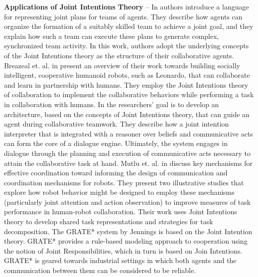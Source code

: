 \documentclass[12pt]{report}
\begin{document}
\textbf{Applications of Joint Intentions Theory} -- In \cite{kinny:planned-team}
authors introduce a language for representing joint plans for teams of agents.
They describe how agents can organize the formation of a suitably skilled team
to achieve a joint goal, and they explain how such a team can execute these
plans to generate complex, synchronized team activity. In this work, authors
adopt the underlying concepts of the Joint Intentions theory as the structure of
their collaborative agents. Breazeal et. al. in \cite{breazeal:humanoid-robots}
present an overview of their work towards building socially intelligent,
cooperative humanoid robots, such as Leonardo, that can collaborate and learn in
partnership with humans. They employ the Joint Intentions theory of
collaboration to implement the collaborative behaviors while performing a task
in collaboration with humans. In \cite{subramanian:joint-intention-dialogue}
the researchers' goal is to develop an architecture, based on the concepts of
Joint Intentions theory, that can guide an agent during collaborative teamwork.
They describe how a joint intention interpreter that is integrated with a
reasoner over beliefs and communicative acts can form the core of a dialogue
engine. Ultimately, the system engages in dialogue through the planning and
execution of communicative acts necessary to attain the collaborative task at
hand. Mutlu et. al. in \cite{mutlu:coordination-robot} discuss key mechanisms
for effective coordination toward informing the design of communication and
coordination mechanisms for robots. They present two illustrative studies that
explore how robot behavior might be designed to employ these mechanisms
(particularly joint attention and action observation) to improve measures of
task performance in human-robot collaboration. Their work uses Joint Intentions
theory to develop shared task representations and strategies for task
decomposition. The GRATE* system by Jennings
\cite{jennings:joint-intention-hybrid} is based on the Joint Intention theory.
GRATE* provides a rule-based modeling approach to cooperation using the notion
of Joint Responsibilities, which in turn is based on Join Intentions. GRATE* is
geared towards industrial settings in which both agents and the communication
between them can be considered to be reliable.\\
\end{document}
